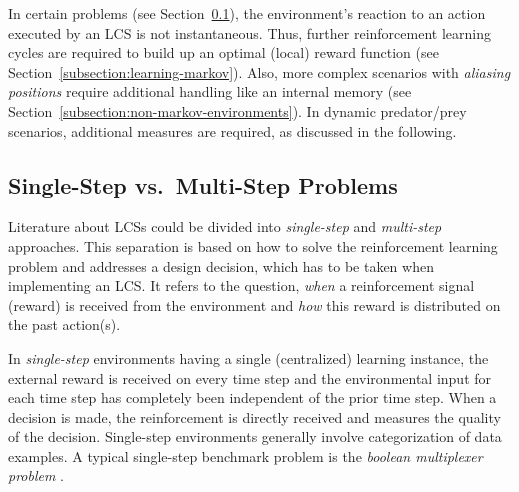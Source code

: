 \documentclass{sig-alternate}
\begin{document}
In certain problems (see Section~\ref{subsection:single-step-vs-multi-step-problems}), the environment's reaction to an action executed by an LCS is not instantaneous. Thus, further reinforcement learning cycles are required to build up an optimal (local) reward function (see Section~\ref{subsection:learning-markov}). Also, more complex scenarios with \emph{aliasing positions} require additional handling like an internal memory (see Section~\ref{subsection:non-markov-environments}). In dynamic predator/prey scenarios, additional measures are required, as discussed in the following.

\subsection{Single-Step vs.\ Multi-Step Problems}
\label{subsection:single-step-vs-multi-step-problems}

Literature about LCSs could be divided into \emph{single-step} and \emph{mul\-ti-step} approaches. This separation is based on how to solve the reinforcement learning problem and addresses a design decision, which has to be taken when implementing an LCS. It refers to the question, \emph{when} a reinforcement signal (reward) is received from the environment and \emph{how} this reward is distributed on the past action(s). 

In \emph{single-step} environments having a single (centralized) learning instance, the external reward is received on every time step and the environmental input for each time step has completely been independent of the prior time step. %
When a decision is made, the reinforcement is directly received and measures the quality of the decision. Single-step environments generally involve categorization of data examples. A typical single-step benchmark problem is the \emph{boolean multiplexer problem} \cite{BKLW04,Wil95}. 
\end{document}
